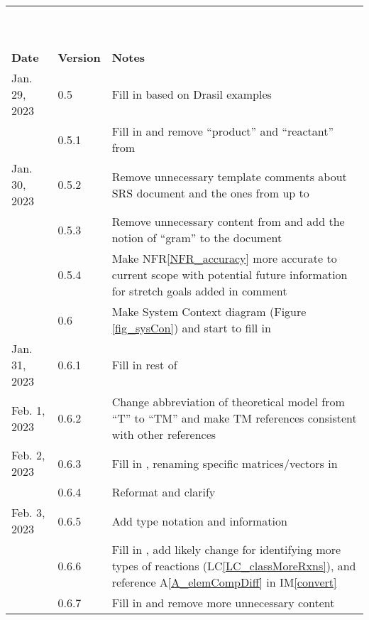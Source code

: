\documentclass[12pt]{article}
\newcommand{\aref}[1]{A\ref{#1}}
\newcommand{\iref}[1]{IM\ref{#1}}
\newcommand{\nfrref}[1]{NFR\ref{#1}}
\newcommand{\lcref}[1]{LC\ref{#1}}
\begin{document}
\begin{tabularx}{\textwidth}{p{2.5cm}p{1.5cm}X}
  \bottomrule~                                                                                              \\
  ~                                                                                                         \\
  \toprule {\bf Date} & {\bf Version} & {\bf Notes}                                                         \\
  \midrule
  Jan. 29, 2023       & 0.5           & Fill in \nameref{sec_intro} based on Drasil examples                \\
                      & 0.5.1         & Fill in \nameref{sec_phySystDesc} and remove ``product'' and
  ``reactant'' from \nameref{sec_termsDefs}                                                                 \\
  Jan. 30, 2023       & 0.5.2         & Remove unnecessary template comments about SRS document
  and the ones from \nameref{sec_specSysDesc} up to \nameref{sec_instance}                                  \\
                      & 0.5.3         & Remove unnecessary content from \nameref{sec_tabSymbs} and
  add the notion of ``gram'' to the document                                                                \\
                      & 0.5.4         & Make \nfrref{NFR_accuracy} more accurate to current scope with
  potential future information for stretch goals added in comment                                           \\
                      & 0.6           & Make System Context diagram (Figure \ref{fig_sysCon}) and start
  to fill in \nameref{sec_sysCon}                                                                           \\
  Jan. 31, 2023       & 0.6.1         & Fill in rest of \nameref{sec_genSysDesc}                            \\
  Feb. 1, 2023        & 0.6.2         & Change abbreviation of theoretical model from ``T'' to
  ``TM'' and make TM references consistent with other references                                            \\
  Feb. 2, 2023        & 0.6.3         & Fill in \nameref{sec_refMat}, renaming specific matrices/vectors
  in \nameref{sec_instance}                                                                                 \\
                      & 0.6.4         & Reformat and clarify \nameref{sec_LCs}                              \\
  Feb. 3, 2023        & 0.6.5         & Add type notation and information                                   \\
                      & 0.6.6         & Fill in \nameref{sec_UCs}, add likely change for identifying
  more types of reactions (\lcref{LC_classMoreRxns}), and reference \aref{A_elemCompDiff} in \iref{convert} \\
                      & 0.6.7         & Fill in \nameref{sec_traceMats} and remove more unnecessary content \\
  \bottomrule
\end{tabularx}
\end{document}
